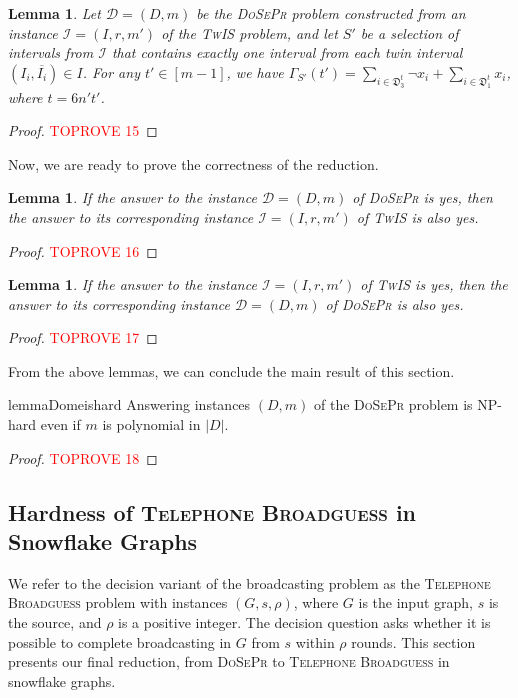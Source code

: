 \documentclass[letterpaper,11pt]{article}
\newtheorem{lemma}[theorem]{Lemma}
\newcommand{\flower}{snowflake\xspace}
\newcommand{\Flower}{Snowflake\xspace}
\newcommand{\tis}{\textsc{TwIS}\xspace}
\newcommand{\dspr}{\textsc{DoSePr}\xspace}
\newcommand{\cds}{\dspr}
\newcommand{\telebg}{\textsc{Telephone Broadguess}\xspace}
\begin{document}
\begin{lemma}\label{lem:gamUpBound}
Let $\mathcal{D}=(D,m)$ be the \dspr problem constructed from an instance $\mathcal{I}=(I,r,m')$ of the \tis problem, and let $S'$ be a selection of intervals from $\mathcal{I}$ that contains exactly one interval from each twin interval $(I_i,\overline{I_i}) \in I$. 
For any $t'\in[m-1]$, we have 
$\Gamma_{S'}(t') = \sum_{i \in \mathfrak{D}_3^t} \neg{x_i} +  \sum_{i \in \mathfrak{D}_1^t} x_i  $, where $t=6n't'$.
\end{lemma}

\begin{proof}\textcolor{red}{TOPROVE 15}\end{proof}

Now, we are ready to prove the correctness of the reduction. 

\begin{lemma}
\label{lemma:DSPR2TIS}
If the answer to the instance $\mathcal{D}=(D,m)$ of \dspr is yes, then the answer to its corresponding instance $\mathcal{I}=(I,r,m')$ of \tis is also yes. 
\end{lemma}
\begin{proof}\textcolor{red}{TOPROVE 16}\end{proof}


\begin{lemma}
\label{lemma:TIS2DSPR}
If the answer to the instance $\mathcal{I}=(I,r,m')$ of \tis is yes, then the answer to its corresponding instance $\mathcal{D}=(D,m)$ of \dspr is also yes.
\end{lemma}
\begin{proof}\textcolor{red}{TOPROVE 17}\end{proof}

From the above lemmas, we can conclude the main result of this section.
\begin{restatable}{lemma}{Domeishard}\label{thm:TIS2DOME}
Answering instances $(D,m)$ of the \dspr problem is NP-hard even if $m$ is polynomial in $|D|$.
\end{restatable}

\begin{proof}\textcolor{red}{TOPROVE 18}\end{proof}
 \subsection{Hardness of \telebg in \Flower Graphs} \label{subsection:telebghard}

We refer to the decision variant of the broadcasting problem as the \telebg problem with instances $(G,s,\rho)$, where $G$ is the input graph, $s$ is the source, and $\rho$ is a positive integer. The decision question asks whether it is possible to complete broadcasting in $G$ from $s$ within $\rho$ rounds. This section presents our final reduction, from \cds to \telebg in \flower graphs. 
\end{document}

